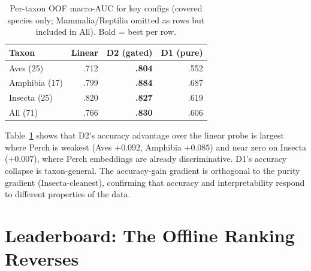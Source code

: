 \documentclass{ceurart}
\begin{document}
\begin{table}[t]
\caption{Per-taxon OOF macro-AUC for key configs (covered species only; Mammalia/Reptilia omitted as rows but included in All). Bold = best per row.}
\label{tab:pertaxon}
\begin{tabular}{lrrr}
\toprule
Taxon & Linear & D2 (gated) & D1 (pure) \\
\midrule
Aves (25)      & .712 & \textbf{.804} & .552 \\
Amphibia (17)  & .799 & \textbf{.884} & .687 \\
Insecta (25)   & .820 & \textbf{.827} & .619 \\
All (71)       & .766 & \textbf{.830} & .606 \\
\bottomrule
\end{tabular}
\end{table}

Table~\ref{tab:pertaxon} shows that D2's accuracy advantage over the linear probe is largest where Perch is weakest (Aves $+0.092$, Amphibia $+0.085$) and near zero on Insecta ($+0.007$), where Perch embeddings are already discriminative.
D1's accuracy collapse is taxon-general.
The accuracy-gain gradient is orthogonal to the purity gradient (Insecta-cleanest), confirming that accuracy and interpretability respond to different properties of the data.


\section{Leaderboard: The Offline Ranking Reverses}
\label{sec:leaderboard}
\end{document}
